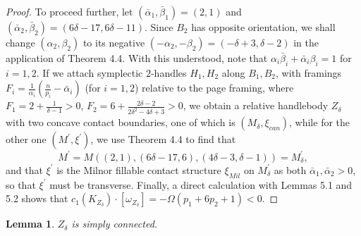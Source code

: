 \documentclass[11pt]{amsart}
\theoremstyle{plain}
\numberwithin{theorem}{section}
\newtheorem{lemma}[theorem]{Lemma}
\theoremstyle{definition}
\begin{document}
\begin{proof}
To proceed further, let $(\bar{\alpha}_1,\bar{\beta}_1)=(2,1)$ and $(\bar{\alpha}_2,\bar{\beta}_2)=(6\delta-17,6\delta-11)$. Since $B_2$ has opposite orientation, we shall change 
$(\alpha_2,\beta_2)$ to its negative $(-\alpha_2,-\beta_2)=(-\delta+3, \delta-2)$ in the application of
Theorem 4.4. With this understood, note that $\alpha_i\bar{\beta}_i+\bar{\alpha}_i\beta_i=1$ for $i=1,2$. If we attach symplectic $2$-handles $H_1,H_2$ along $B_1,B_2$, with framings 
$F_i=\frac{1}{\alpha_i}(\frac{n}{p_i}-\bar{\alpha}_i)$ (for $i=1,2$) relative to the page framing, 
where $F_1=2+\frac{1}{\delta-1}>0$, $F_2=6+\frac{2\delta-2}{2\delta^2-4\delta+3}>0$, we obtain a 
relative handlebody $Z_\delta$ with two concave contact boundaries, one of which is 
$(M_\delta,\xi_{can})$, while for the other one $(M^\prime,\xi^\prime)$, we use Theorem 4.4 to find that 
$$
M^\prime=M((2,1), (6\delta-17,6), (4\delta-3, \delta-1))=M_\delta^\prime, 
$$
and that $\xi^\prime$ is the Milnor fillable contact structure $\xi_{Mil}$ on $M_\delta^\prime$ as both 
$\bar{\alpha}_1, \bar{\alpha}_2>0$, so that $\xi^\prime$ must be transverse. Finally, a direct calculation with
Lemmas 5.1 and 5.2 shows that 
$c_1(K_{Z_\delta})\cdot [\omega_{Z_\delta}]=-\Omega (p_1+6p_2+1)<0$. 

\end{proof}

\begin{lemma}
$Z_\delta$ is simply connected. 
\end{lemma}
\end{document}
